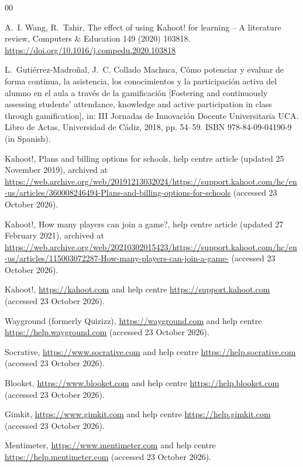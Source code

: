 \documentclass[preprint,12pt, a4paper]{elsarticle}
\begin{document}
\begin{thebibliography}{00}
\small

 A.~I. Wang, R.~Tahir, The effect of using Kahoot! for learning -- A literature review, Computers \& Education 149 (2020) 103818. \url{https://doi.org/10.1016/j.compedu.2020.103818}

 L.~Gutiérrez-Madroñal, J.~C. Collado Machuca, Cómo potenciar y evaluar de forma continua, la asistencia, los conocimientos y la participación activa del alumno en el aula a través de la gamificación [Fostering and continuously assessing students' attendance, knowledge and active participation in class through gamification], in: III Jornadas de Innovación Docente Universitaria UCA. Libro de Actas, Universidad de Cádiz, 2018, pp. 54--59. ISBN 978-84-09-04190-9 (in Spanish).

 Kahoot!, Plans and billing options for schools, help centre article (updated 25 November 2019), archived at \url{https://web.archive.org/web/20191213032024/https://support.kahoot.com/hc/en-us/articles/360008246494-Plans-and-billing-options-for-schools} (accessed 23 October 2026).

 Kahoot!, How many players can join a game?, help centre article (updated 27 February 2021), archived at \url{https://web.archive.org/web/20210302015423/https://support.kahoot.com/hc/en-us/articles/115003072287-How-many-players-can-join-a-game-} (accessed 23 October 2026).

 Kahoot!, \url{https://kahoot.com} and help centre \url{https://support.kahoot.com} (accessed 23 October 2026).

 Wayground (formerly Quizizz), \url{https://wayground.com} and help centre \url{https://help.wayground.com} (accessed 23 October 2026).

 Socrative, \url{https://www.socrative.com} and help centre \url{https://help.socrative.com} (accessed 23 October 2026).

 Blooket, \url{https://www.blooket.com} and help centre \url{https://help.blooket.com} (accessed 23 October 2026).

 Gimkit, \url{https://www.gimkit.com} and help centre \url{https://help.gimkit.com} (accessed 23 October 2026).

 Mentimeter, \url{https://www.mentimeter.com} and help centre \url{https://help.mentimeter.com} (accessed 23 October 2026).


\end{thebibliography}
\end{document}
